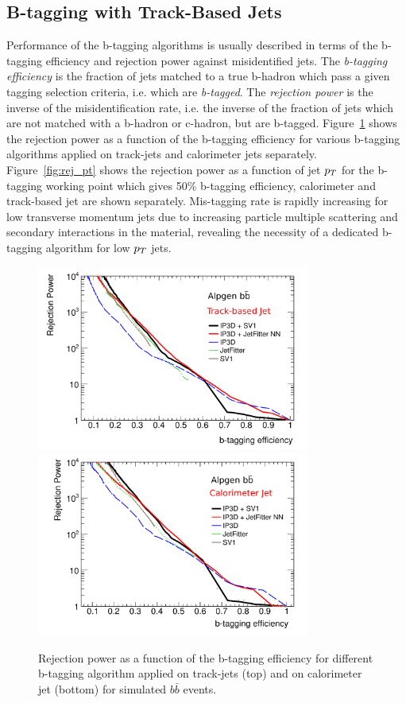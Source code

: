 \subsection{B-tagging with Track-Based Jets}
Performance of the b-tagging algorithms is usually described in terms of the b-tagging
efficiency and rejection power against misidentified jets. The \emph{b-tagging efficiency} is the fraction of jets
matched to a true b-hadron which pass a given tagging selection criteria, i.e. which are \emph{b-tagged}.
The \emph{rejection power} is the inverse of the misidentification rate, i.e. the inverse of the fraction 
of jets which are not matched with a b-hadron or c-hadron, but are b-tagged. 
Figure~\ref{fig:eff_rej} shows the rejection power as a function of the b-tagging efficiency for various b-tagging 
algorithms applied on track-jets and calorimeter jets separately. Figure~\ref{fig:rej_pt}  shows the rejection power as a function of jet $p_{T}$ for the
b-tagging working point  which gives 50\% b-tagging efficiency, calorimeter and track-based jet are shown separately. Mis-tagging rate is rapidly increasing
for low transverse momentum jets due to increasing particle multiple scattering and secondary interactions in the material,
revealing the necessity of a dedicated b-tagging algorithm for low $p_{T}$ jets.

\begin{figure}[!tp]
\centering
\includegraphics[width=0.8\textwidth]{figure/trackjet/std_eff_rej2.pdf}
\includegraphics[width=0.8\textwidth]{figure/trackjet/std_cal_eff_rej2.pdf}
\caption{Rejection power as a function of the b-tagging efficiency for different b-tagging algorithm applied
	 on track-jets (top) and on calorimeter jet (bottom) for simulated $b\bar{b}$ events.}
\label{fig:eff_rej}
\end{figure}    


